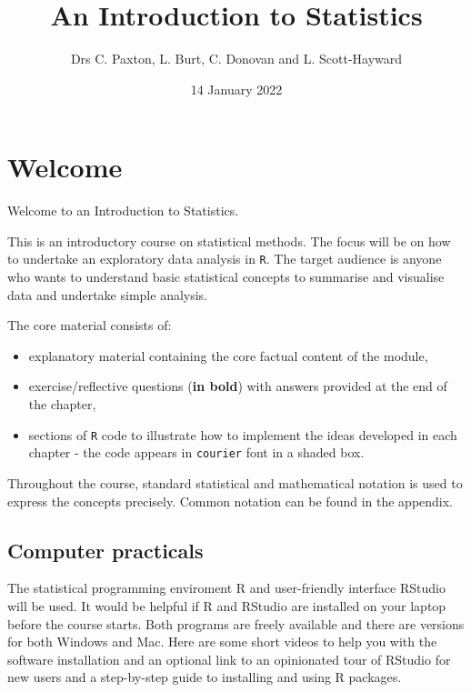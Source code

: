 \documentclass[
  oneside]{krantz}
\title{An Introduction to Statistics}
\author{Drs C. Paxton, L. Burt, C. Donovan and L. Scott-Hayward}
\date{14 January 2022}
\providecommand{\tightlist}{%
  \setlength{\itemsep}{0pt}\setlength{\parskip}{0pt}}
\begin{document}
\maketitle

{
\hypersetup{linkcolor=}
\setcounter{tocdepth}{2}
\tableofcontents
}
\hypertarget{welcome}{%
\chapter*{Welcome}\label{welcome}}


Welcome to an Introduction to Statistics.

This is an introductory course on statistical methods. The focus will be on how to undertake an exploratory data analysis in \texttt{R}. The target audience is anyone who wants to understand basic statistical concepts to summarise and visualise data and undertake simple analysis.

The core material consists of:

\begin{itemize}
\tightlist
\item
  explanatory material containing the core factual content of the module,
\item
  exercise/reflective questions (\textbf{in bold}) with answers provided at the end of the chapter,
\item
  sections of \texttt{R} code to illustrate how to implement the ideas developed in each chapter - the code appears in \texttt{courier} font in a shaded box.
\end{itemize}

Throughout the course, standard statistical and mathematical notation is used to express the concepts precisely. Common notation can be found in the appendix.

\hypertarget{computer-practicals}{%
\section*{Computer practicals}\label{computer-practicals}}


The statistical programming enviroment R and user-friendly interface RStudio will be used. It would be helpful if R and RStudio are installed on your laptop before the course starts. Both programs are freely available and there are versions for both Windows and Mac. Here are some short videos to help you with the software installation and an optional link to an opinionated tour of RStudio for new users and a step-by-step guide to installing and using R packages.
\end{document}
